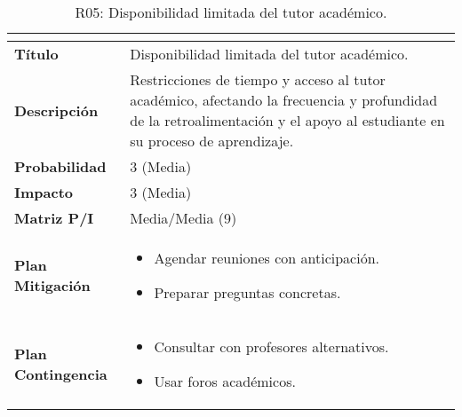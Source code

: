 \begin{table}[H]
\centering
\begin{tabular}{|>{\bfseries}l|p{10cm}|}
\hline
\rowcolor{lightgray}
\multicolumn{2}{|c|}{\textbf{Riesgo R05}} \\ \hline
Título & Disponibilidad limitada del tutor académico.\\ \hline
Descripción & Restricciones de tiempo y acceso al tutor académico, afectando la frecuencia y profundidad de la retroalimentación y el apoyo al estudiante en su proceso de aprendizaje. \\ \hline
Probabilidad & 3 (Media) \cellcolor{yellowrisk}\\ \hline
Impacto & 3 (Media) \cellcolor{yellowrisk}\\ \hline
Matriz P/I & Media/Media (9)\\ \hline
Plan Mitigación & 
\begin{itemize}
\item Agendar reuniones con anticipación.
\item Preparar preguntas concretas.
\end{itemize} \\ \hline
Plan Contingencia & 
\begin{itemize}
\item Consultar con profesores alternativos.
\item Usar foros académicos.
\end{itemize} \\ \hline
\end{tabular}
\caption{R05: Disponibilidad limitada del tutor académico.}
\label{tab:R05}
\end{table}

